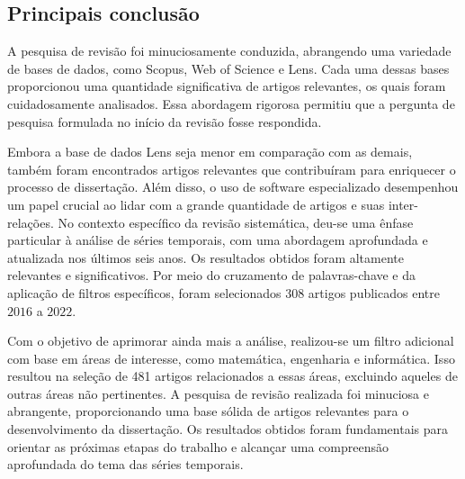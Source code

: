 \newpage

\subsection{Principais conclus\~ao} \label{subsec:conclusão da revisão}

A pesquisa de revisão foi minuciosamente conduzida, abrangendo uma variedade de bases de dados, como Scopus, Web of Science e Lens. Cada uma dessas bases proporcionou uma quantidade significativa de artigos relevantes, os quais foram cuidadosamente analisados. Essa abordagem rigorosa permitiu que a pergunta de pesquisa formulada no início da revisão fosse respondida.

Embora a base de dados Lens seja menor em comparação com as demais, também foram encontrados artigos relevantes que contribuíram para enriquecer o processo de dissertação. Além disso, o uso de software especializado desempenhou um papel crucial ao lidar com a grande quantidade de artigos e suas inter-relações.
No contexto específico da revisão sistemática, deu-se uma ênfase particular à análise de séries temporais, com uma abordagem aprofundada e atualizada nos últimos seis anos. Os resultados obtidos foram altamente relevantes e significativos. Por meio do cruzamento de palavras-chave e da aplicação de filtros específicos, foram selecionados $308$ artigos publicados entre $2016$ a $2022$.

Com o objetivo de aprimorar ainda mais a análise, realizou-se um filtro adicional com base em áreas de interesse, como matemática, engenharia e informática. Isso resultou na seleção de 481 artigos relacionados a essas áreas, excluindo aqueles de outras áreas não pertinentes.
A pesquisa de revisão realizada foi minuciosa e abrangente, proporcionando uma base sólida de artigos relevantes para o desenvolvimento da dissertação. Os resultados obtidos foram fundamentais para orientar as próximas etapas do trabalho e alcançar uma compreensão aprofundada do tema das séries temporais.